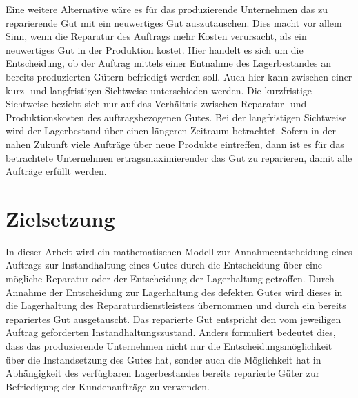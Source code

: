 Eine weitere Alternative wäre es für das produzierende Unternehmen das zu reparierende Gut mit ein neuwertiges Gut auszutauschen. Dies macht vor allem Sinn, wenn die Reparatur des Auftrags mehr Kosten verursacht, als ein neuwertiges Gut in der Produktion kostet. Hier handelt es sich um die Entscheidung, ob der Auftrag mittels einer Entnahme des Lagerbestandes an bereits produzierten Gütern befriedigt werden soll. Auch hier kann zwischen einer kurz- und langfristigen Sichtweise unterschieden werden. Die kurzfristige Sichtweise bezieht sich nur auf das Verhältnis zwischen Reparatur- und Produktionskosten des auftragsbezogenen Gutes. Bei der langfristigen Sichtweise wird der Lagerbestand über einen längeren Zeitraum betrachtet.  Sofern in der nahen Zukunft viele Aufträge über neue Produkte eintreffen, dann ist es für das betrachtete Unternehmen ertragsmaximierender das Gut zu reparieren, damit alle Aufträge erfüllt werden.




\section{Zielsetzung}

In dieser Arbeit wird ein mathematischen Modell zur Annahmeentscheidung eines Auftrags zur Instandhaltung eines Gutes durch die Entscheidung über eine mögliche Reparatur oder der Entscheidung der Lagerhaltung getroffen. Durch Annahme der Entscheidung zur Lagerhaltung des defekten Gutes wird dieses in die Lagerhaltung des Reparaturdienstleisters übernommen und durch ein bereits repariertes Gut ausgetauscht. Das reparierte Gut entspricht den vom jeweiligen Auftrag geforderten Instandhaltungszustand. Anders formuliert bedeutet dies, dass das produzierende Unternehmen nicht nur die Entscheidungsmöglichkeit über die Instandsetzung des Gutes hat, sonder auch die Möglichkeit hat in Abhängigkeit des verfügbaren Lagerbestandes bereits reparierte Güter zur Befriedigung der Kundenaufträge zu verwenden.

